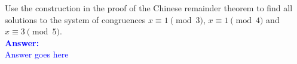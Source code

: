 \item{}
Use the construction in the proof of the Chinese remainder theorem to find all
solutions to the system of congruences $x\equiv1\pmod3$, $x\equiv1\pmod4$ and
$x\equiv3\pmod5$.
\\[12pt]
\ifanswers
\textcolor{blue}{
\textbf{Answer:}\\[6pt]
Answer goes here
}
\newpage
\fi
